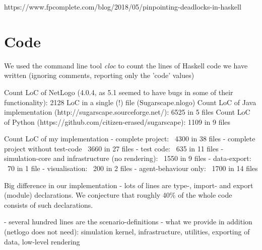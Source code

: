 https://www.fpcomplete.com/blog/2018/05/pinpointing-deadlocks-in-haskell

\section{Code}
We used the command line tool \textit{cloc} to count the lines of Haskell code we have written (ignoring comments, reporting only the 'code' values)

Count LoC of NetLogo (4.0.4, as 5.1 seemed to have bugs in some of their functionality): 2128 LoC in a single (!) file (Sugarscape.nlogo)
Count LoC of Java implementation (http://sugarscape.sourceforge.net/): 6525 in 5 files
Count LoC of Python (https://github.com/citizen-erased/sugarscape): 1109 in 9 files

Count LoC of my implementation
- complete project: ~4300 in 38 files
- complete project without test-code ~3660 in 27 files
- test code: ~635 in 11 files
- simulation-core and infrastructure (no rendering): ~1550 in 9 files
- data-export: ~70 in 1 file
- visualisation: ~200 in 2 files
- agent-behaviour only: ~1700 in 14 files

Big difference in our implementation
- lots of lines are type-, import- and export (module) declarations. We conjecture that roughly 40\% of the whole code consists of such declarations.

- several hundred lines are the scenario-definitions
- what we provide in addition (netlogo does not need): simulation kernel, infrastructure, utilities, exporting of data, low-level rendering